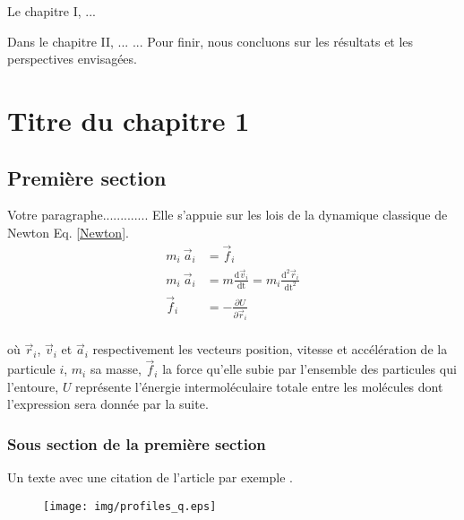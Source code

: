 \documentclass{DChibouti}
\begin{document}
Le chapitre I, ...

Dans le chapitre II, ...
...
Pour finir, nous concluons sur les résultats et les perspectives envisagées.

\chapter{Titre du chapitre 1}

\section{Première section}

Votre paragraphe............. Elle s’appuie sur les lois de la dynamique classique de Newton Eq. \eqref{Newton}.
\begin{equation}
\label{Newton}
\begin{aligned}
 m_i \ \vec {a}_i &=\vec {f}_i \\ 
 m_i \ \vec {a}_i & = m \frac{\mathrm{d} \vec {v}_i}{\mathrm{dt}}=m_i \frac{\mathrm{d}^{2} \vec {r}_i}{\mathrm{dt}^{2}}\\
 \vec {f}_i &= - \frac{\partial U}{\partial \vec {r}_i}\\
\end{aligned}
\end{equation}	   

où $\vec {r}_i$, $\vec {v}_i$ et $\vec {a}_i$ respectivement les vecteurs position, vitesse et accélération de la particule $i$, $m_i$ sa masse, $\vec {f}_i$ la force qu'elle subie par l'ensemble des particules qui l'entoure, $U$ représente l'énergie intermoléculaire totale entre les molécules dont l'expression sera donnée par la suite.


\subsection{Sous section de la première section}
Un texte avec une citation de l'article par exemple  \cite{CHIBOUTI2020}. 
\begin{figure}[htbp]
    \centering
    \texttt{[image: img/profiles\_q.eps]}
    \label{fig:periodic}
\end{figure}
\end{document}

